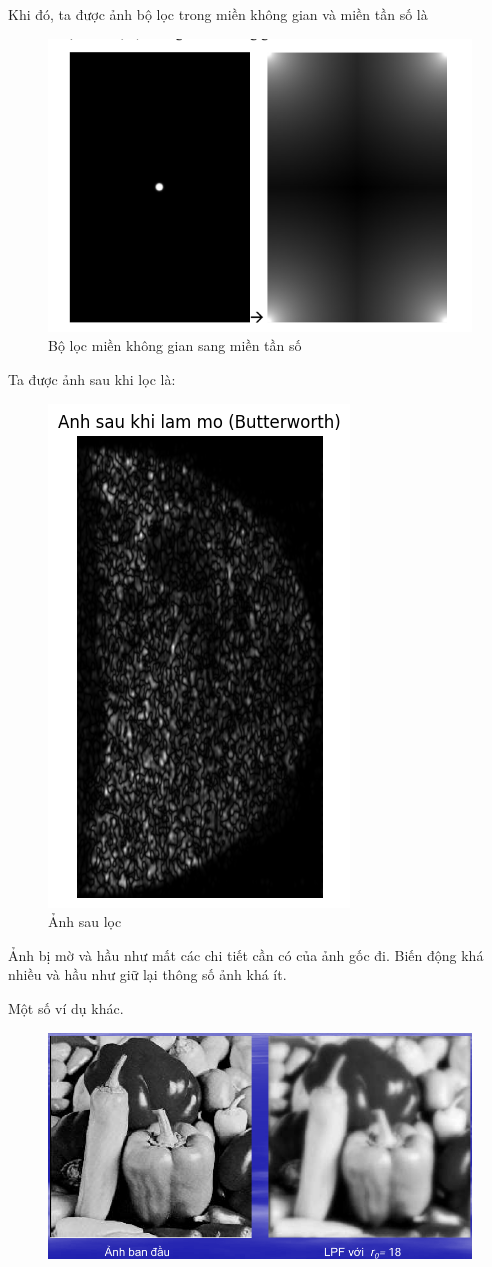 \documentclass[12pt,a4paper]{report}
\numberwithin{equation}{section}
\theoremstyle{definition} %
\begin{document}
Khi đó, ta được ảnh bộ lọc trong miền không gian và miền tần số là 
\begin{figure}[H]
\centering
\includegraphics[width=0.8\linewidth]{img/butterworthKG-TS.png}
\caption{Bộ lọc miền không gian sang miền tần số}
\label{fig120}
\end{figure}

Ta được ảnh sau khi lọc là:

\begin{figure}[H]
\centering
\includegraphics[width=0.35\linewidth]{img/butterworthLowpassFilter.png}
\caption{Ảnh sau lọc}
\label{fig121}
\end{figure}
Ảnh bị mờ và hầu như mất các chi tiết cần có của ảnh gốc đi. Biến động khá nhiều và hầu như  giữ lại thông số ảnh khá ít. 

Một số ví dụ khác.
\begin{figure}[H]
\centering
\includegraphics[width=0.88\linewidth]{img/BLPF2.png}
\caption{}
\label{fig122}
\end{figure}
\end{document}
